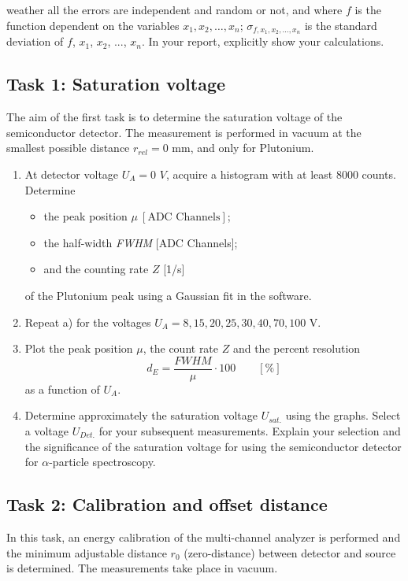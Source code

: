weather all the errors are independent and random or not, and where $f$ is the function dependent on the variables $x_1, x_2, …, x_n$; $\sigma_{f, x_1, x_2,..., x_n}$ is the standard deviation of $f$, $x_1$, $x_2$, ..., $x_n$. In your report, explicitly show your calculations.

%
\subsection{Task 1: Saturation voltage}
The aim of the first task is to determine the saturation voltage of the semiconductor detector. The measurement is performed in vacuum at the smallest possible distance $r_{rel} = 0$ mm, and only for Plutonium.
\begin{enumerate}[label=\textbf{\alph*)}]
	\item At detector voltage $U_A = 0$ $V$, acquire a histogram with at least 8000 counts. Determine 
		\begin{itemize}[nosep]
		\item the peak position $\mu\ [\text{ADC Channels}]$;
		\item the half-width \textit{FWHM} [ADC Channels];
		\item and the counting rate $Z$ [1/s]
	\end{itemize}
	of the Plutonium peak using a Gaussian fit in the software.
	\item Repeat a) for the voltages $U_A = 8, 15, 20, 25, 30, 40, 70, 100$ V.
	\item Plot the peak position $\mu$, the count rate $Z$ and the percent resolution 
		\begin{equation}
			d_E = \frac{\textit{FWHM}}{\mu} \cdot 100 \qquad [\%]
		\end{equation}
	 as a function of $U_A$.
	\item Determine approximately the saturation voltage $U_{sat.}$ using the graphs. Select a voltage $U_{Det.}$ for your subsequent measurements. Explain your selection and the significance of the saturation voltage for using the semiconductor detector for $\alpha$-particle spectroscopy.
\end{enumerate}

\subsection{Task 2: Calibration and offset distance}
In this task, an energy calibration of the multi-channel analyzer is performed and the minimum adjustable distance $r_0$ (zero-distance) between detector and source is determined. The measurements take place in vacuum. 

